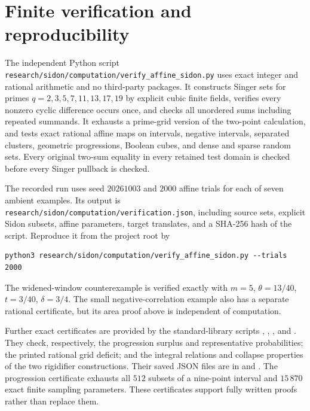 \documentclass[11pt]{article}
\theoremstyle{definition}
\theoremstyle{remark}
\begin{document}
\section{Finite verification and reproducibility}

The independent Python script
\texttt{research/sidon/computation/verify\_affine\_sidon.py}
uses exact integer and rational arithmetic and no third-party packages.
It constructs Singer sets for primes $q=2,3,5,7,11,13,17,19$ by explicit
cubic finite fields, verifies every nonzero cyclic difference occurs
once, and checks all unordered sums including repeated summands.
It exhausts a prime-grid version of the two-point calculation, and
tests exact rational affine maps on intervals, negative intervals,
separated clusters, geometric progressions, Boolean cubes, and dense
and sparse random sets. Every original two-sum equality in every
retained test domain is checked before every Singer pullback is checked.

The recorded run uses seed $20261003$ and $2000$ affine trials for each
of seven ambient examples. Its output is
\texttt{research/sidon/computation/verification.json}, including source
sets, explicit Sidon subsets, affine parameters, target translates,
and a SHA-256 hash of the script. Reproduce it from the project root by
\begin{verbatim}
python3 research/sidon/computation/verify_affine_sidon.py --trials 2000
\end{verbatim}
The widened-window counterexample is verified exactly with
$m=5$, $\theta=13/40$, $t=3/40$, $\delta=3/4$.
The small negative-correlation example also has a separate rational
certificate, but its area proof above is independent of computation.

Further exact certificates are provided by the standard-library scripts
,
,
, and
.
They check, respectively, the progression surplus and representative
probabilities; the printed rational grid deficit; and the integral
relations and collapse properties of the two rigidifier constructions.
Their saved JSON files are in 
and .
The progression certificate exhausts all $512$ subsets of a nine-point
interval and $15\,870$ exact finite sampling parameters.
These certificates support fully written proofs rather than replace them.
\end{document}
